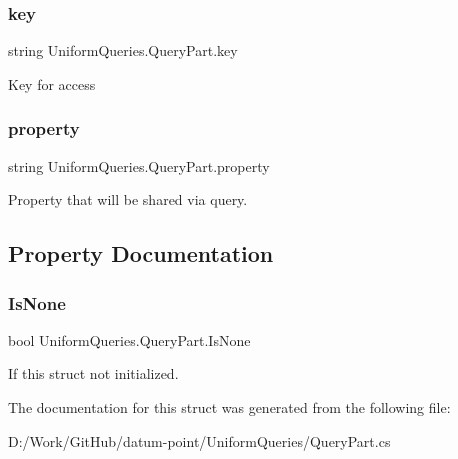\subsubsection{\texorpdfstring{key}{key}}
{\footnotesize\ttfamily string Uniform\+Queries.\+Query\+Part.\+key}



Key for access 

\mbox{\label{struct_uniform_queries_1_1_query_part_aa8167f347217469ed47b298f2bc16381}} 
\subsubsection{\texorpdfstring{property}{property}}
{\footnotesize\ttfamily string Uniform\+Queries.\+Query\+Part.\+property}



Property that will be shared via query. 



\subsection{Property Documentation}
\mbox{\label{struct_uniform_queries_1_1_query_part_af380375ca82e9dc2eecf899b5933fe2b}} 
\subsubsection{\texorpdfstring{Is\+None}{IsNone}}
{\footnotesize\ttfamily bool Uniform\+Queries.\+Query\+Part.\+Is\+None\hspace{0.3cm}{\ttfamily [get]}}



If this struct not initialized. 



The documentation for this struct was generated from the following file\+:\begin{DoxyCompactItemize}
\item 
D\+:/\+Work/\+Git\+Hub/datum-\/point/\+Uniform\+Queries/Query\+Part.\+cs\end{DoxyCompactItemize}
